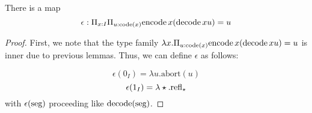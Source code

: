 \documentclass[main.tex]{subfiles}
\begin{document}
\begin{lemma}
    There is a map 
    $$ \epsilon : \Pi_{x : I} \Pi_{u : \text{code}(x)} \normalfont \text{encode} \, x (\text{decode} \, x u) = u$$
\end{lemma}
\begin{proof}
First, we note that the type family $\lambda x.\Pi_{u : \text{code}(x)} \normalfont \text{encode} \, x (\text{decode} \, x u) = u $ is inner due to previous lemmas. Thus, we can define $\epsilon$ as follows:

$$\epsilon(0_I) = \lambda u. \text{abort}(u)$$
$$\epsilon(1_I) = \lambda \star. \text{refl}_{\star}$$
with $\epsilon(\text{seg})$ proceeding like $\text{decode} (\text{seg})$.
\end{proof}
\end{document}
